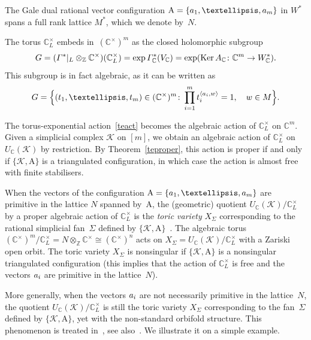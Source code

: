 \documentclass[a4paper]{amsart}
\theoremstyle{definition}
\theoremstyle{remark}
\numberwithin{equation}{section}
\def\C{\mathbb C}
\def\Z{\mathbb Z}
\def\sK{\mathcal K}
\newcommand{\mb}[1]{{\textbf {\textit#1}}}
\def\Ker{\mathop{\mathrm{Ker}}}
\newcommand{\<}{\langle}
\renewcommand{\>}{\rangle}
\begin{document}
The Gale dual rational vector configuration $\mathrm A=\{\mb a_1,\ldots,\mb a_m\}$ in $W^*$ spans a full rank lattice $M^*$, which we denote by~$N$.

The torus $\C^\times_L$ embeds in~$(\C^\times)^m$ as the closed holomorphic subgroup
\begin{equation}\label{cvsub}
 G= (\varGamma^*|_L\otimes_\Z\C^\times)
  (\C^\times_L)=\exp\varGamma^*_\C(V_\C)\\
  =\exp(\Ker A_\C\colon\C^m\to W^*_\C).
\end{equation}
This subgroup is in fact algebraic, as it can be written as
\begin{equation}\label{Ggrou}
  G=\Bigl\{(t_1,\ldots,t_m)\in(\C^\times)^m\colon
  \prod_{i=1}^m t_i^{\langle\mb a_i,\mb w\rangle}=1,\quad
  \mb w \in M\Bigr\}.
\end{equation}

The torus-exponential action~\eqref{teact} becomes the algebraic action of 
$\C^\times_L$ on $\C^m$. Given a simplicial complex $\sK$ on $[m]$, we obtain an algebraic action of $\C^\times_L$ on $U_\C(\sK)$ by restriction. By Theorem~\ref{teproper}, this action is proper if and only if $\{\sK,\mathrm A\}$ is a triangulated configuration, in which case the action is almost free with finite stabilisers.

When the vectors of the configuration $\mathrm A=\{\mb a_1,\ldots,\mb a_m\}$ are primitive in the lattice $N$ spanned by~$\mathrm A$, the (geometric) quotient $U_\C(\sK)/\C^\times_L$ by a proper algebraic action of 
$\C^\times_L$ is the \emph{toric variety} $X_{\Sigma}$ corresponding to the rational simplicial fan~$\Sigma$ defined by 
$\{\sK,\mathrm A\}$~\cite[\S5.1]{c-l-s11}. The algebraic torus $(\C^\times)^m/\C^\times_L=N\otimes_\Z\C^\times\cong(\C^\times)^n$ acts on $X_\Sigma=U_\C(\sK)/\C^\times_L$ with a Zariski open orbit. The toric variety $X_\Sigma$ is nonsingular if $\{\sK,\mathrm A\}$ is a nonsingular triangulated configuration (this implies that the action of $\C^\times_L$ is free and the vectors 
$\mb a_i$ are primitive in the lattice~$N$).

More generally, when the vectors $\mb a_i$ are not necessarily primitive in the lattice~$N$, the quotient $U_\C(\sK)/\C^\times_L$ is still the toric variety $X_{\Sigma}$ corresponding to the fan~$\Sigma$ defined by $\{\sK,\mathrm A\}$, yet with the non-standard orbifold structure. This phenomenon is treated in~\cite[\S4]{me-ve04}, see also~\cite{ba-za17}. We illustrate it on a simple example.
\end{document}

